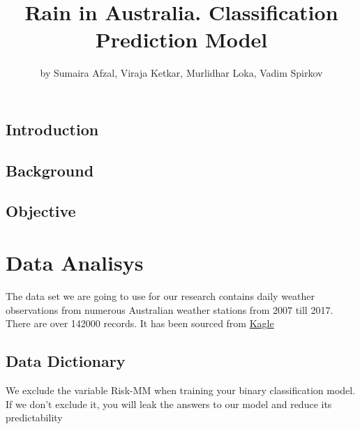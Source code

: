 \title{Rain in Australia. Classification Prediction Model}
\author{by Sumaira Afzal, Viraja Ketkar, Murlidhar Loka, Vadim Spirkov}

\maketitle



\hypertarget{introduction}{%
\subsection{Introduction}\label{introduction}}

\hypertarget{background}{%
\subsection{Background}\label{background}}

\hypertarget{objective}{%
\subsection{Objective}\label{objective}}

\hypertarget{data-analisys}{%
\section{Data Analisys}\label{data-analisys}}

The data set we are going to use for our research contains daily weather
observations from numerous Australian weather stations from 2007 till
2017. There are over 142000 records. It has been sourced from
\href{https://www.kaggle.com/jsphyg/weather-dataset-rattle-package}{Kagle}

\hypertarget{data-dictionary}{%
\subsection{Data Dictionary}\label{data-dictionary}}

We exclude the variable Risk-MM when training your binary classification
model. If we don't exclude it, you will leak the answers to our model
and reduce its predictability

